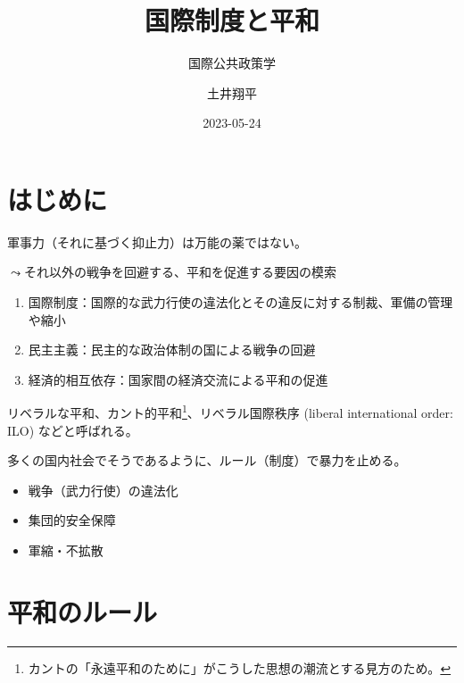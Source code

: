 \documentclass[
  xelatex,
  ja=standard]{bxjsarticle}
\title{国際制度と平和}
\subtitle{国際公共政策学}
\author{土井翔平}
\date{2023-05-24}
\providecommand{\tightlist}{%
  \setlength{\itemsep}{0pt}\setlength{\parskip}{0pt}}\usepackage{longtable,booktabs,array}
\begin{document}
\maketitle
\ifdefined\Shaded\renewenvironment{Shaded}{\begin{tcolorbox}[breakable, interior hidden, borderline west={3pt}{0pt}{shadecolor}, enhanced, boxrule=0pt, frame hidden, sharp corners]}{\end{tcolorbox}}\fi

\hypertarget{ux306fux3058ux3081ux306b}{%
\section*{はじめに}\label{ux306fux3058ux3081ux306b}}

軍事力（それに基づく抑止力）は万能の薬ではない。

\(\leadsto\)それ以外の戦争を回避する、平和を促進する要因の模索

\begin{enumerate}
\def\labelenumi{\arabic{enumi}.}
\tightlist
\item
  国際制度：国際的な武力行使の違法化とその違反に対する制裁、軍備の管理や縮小
\item
  民主主義：民主的な政治体制の国による戦争の回避
\item
  経済的相互依存：国家間の経済交流による平和の促進
\end{enumerate}

リベラルな平和、カント的平和\citep{oneal1997, oneal1999}\footnote{カントの「永遠平和のために」がこうした思想の潮流とする見方のため。}、リベラル国際秩序
(liberal international order: ILO)
\citep{ikenberry2009, ikenberry2018}などと呼ばれる。

多くの国内社会でそうであるように、ルール（制度）で暴力を止める。

\begin{itemize}
\tightlist
\item
  戦争（武力行使）の違法化
\item
  集団的安全保障
\item
  軍縮・不拡散
\end{itemize}

\hypertarget{ux5e73ux548cux306eux30ebux30fcux30eb}{%
\section{平和のルール}\label{ux5e73ux548cux306eux30ebux30fcux30eb}}
\end{document}
